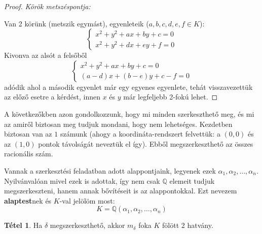 \documentclass[12pt]{book}
\theoremstyle{plain} %
\theoremstyle{definition} %
\newtheorem{theo/}{Tétel}[section]
\newenvironment{theo}
  {\renewcommand{\qedsymbol}{$\clubsuit$}%
   \pushQED{\qed}\begin{theo/}}
  {\popQED\end{theo/}}
\theoremstyle{remark}
\renewcommand\qedsymbol{$\blacksquare$}
\numberwithin{equation}{section}  %
\begin{document}
\begin{proof}
		\textit{Körök metszéspontja:}
		
		Van 2 körünk (metszik egymást), egyenleteik ($a,b,c,d,e,f\in K$):
		\[
		\begin{cases*}
		x^2+y^2+ax+by+c=0 \\
		x^2+y^2+dx+ey+f=0
		\end{cases*}
		\]
		Kivonva az alsót a felsőből
		\[
		\begin{cases*}
		x^2+y^2+ax+by+c=0 \\
		(a-d)x+(b-e)y+c-f=0
		\end{cases*}
		\]
		adódik ahol a második egyenlet már egy egyenes egyenlete, tehát visszavezettük az előző esetre a kérdést, innen $x$ és $y$ már legfeljebb 2-fokú lehet.	
	\end{proof}

	A következőkben azon gondolkozzunk, hogy mi minden szerkeszthető meg, és mi az amiről biztosan meg tudjuk mondani, hogy nem lehetséges. Kezdetben biztosan van az $1$ számunk (ahogy a koordináta-rendszert felvettük: a $(0,0)$ és az $(1,0)$ pontok távolságát neveztük el így). Ebből megszerkeszthető az összes racionális szám.
	
	Vannak a szerkesztési feladatban adott alappontjaink, legyenek ezek $\alpha_1, \alpha_2, \ldots , \alpha_n$. Nyilvánvalóan mivel ezek is adottak, így nem csak $\mathbb{Q}$ elemeit tudjuk megszerkeszteni, hanem annak bővítéseit is az alappontokkal. Ezt nevezem \textbf{alaptest}nek és $K$-val jelölöm most:
	\[ K = \mathbb{Q}(\alpha_1,\alpha_2,\ldots,\alpha_n)  \]
	
	\begin{theo}\label{szukseges}
		Ha $\delta$ megszerkeszthető, akkor $m_\delta$ foka $K$ fölött 2 hatvány.
	\end{theo}
\end{document}
